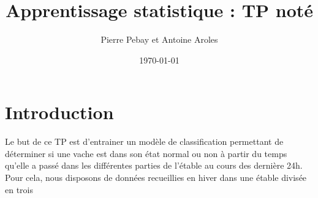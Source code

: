\documentclass[a4paper,12pt]{article}
\title{Apprentissage statistique : TP noté}  %
\author{Pierre Pebay et Antoine Aroles}
\date{\today}  %
\begin{document}
\maketitle

\section{Introduction}
Le but de ce TP est d'entrainer un modèle de classification permettant de déterminer si une vache est dans son état normal ou non à partir du temps qu'elle a passé dans les différentes parties de l'étable au cours des dernière 24h. Pour cela, nous disposons de données recueillies en hiver dans une étable divisée en trois 
\end{document}
